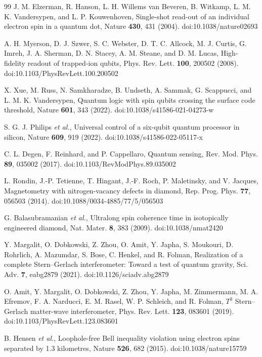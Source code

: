 \documentclass[12pt]{article}
\begin{document}
\begin{thebibliography}{99}
 J. M. Elzerman, R. Hanson, L. H. Willems van Beveren, B. Witkamp, L. M. K. Vandersypen, and L. P. Kouwenhoven, Single-shot read-out of an individual electron spin in a quantum dot, Nature \textbf{430}, 431 (2004). doi:10.1038/nature02693

 A. H. Myerson, D. J. Szwer, S. C. Webster, D. T. C. Allcock, M. J. Curtis, G. Imreh, J. A. Sherman, D. N. Stacey, A. M. Steane, and D. M. Lucas, High-fidelity readout of trapped-ion qubits, Phys. Rev. Lett. \textbf{100}, 200502 (2008). doi:10.1103/PhysRevLett.100.200502

 X. Xue, M. Russ, N. Samkharadze, B. Undseth, A. Sammak, G. Scappucci, and L. M. K. Vandersypen, Quantum logic with spin qubits crossing the surface code threshold, Nature \textbf{601}, 343 (2022). doi:10.1038/s41586-021-04273-w

 S. G. J. Philips \emph{et al.}, Universal control of a six-qubit quantum processor in silicon, Nature \textbf{609}, 919 (2022). doi:10.1038/s41586-022-05117-x

 C. L. Degen, F. Reinhard, and P. Cappellaro, Quantum sensing, Rev. Mod. Phys. \textbf{89}, 035002 (2017). doi:10.1103/RevModPhys.89.035002

 L. Rondin, J.-P. Tetienne, T. Hingant, J.-F. Roch, P. Maletinsky, and V. Jacques, Magnetometry with nitrogen-vacancy defects in diamond, Rep. Prog. Phys. \textbf{77}, 056503 (2014). doi:10.1088/0034-4885/77/5/056503

 G. Balasubramanian \emph{et al.}, Ultralong spin coherence time in isotopically engineered diamond, Nat. Mater. \textbf{8}, 383 (2009). doi:10.1038/nmat2420

 Y. Margalit, O. Dobkowski, Z. Zhou, O. Amit, Y. Japha, S. Moukouri, D. Rohrlich, A. Mazumdar, S. Bose, C. Henkel, and R. Folman, Realization of a complete Stern--Gerlach interferometer: Toward a test of quantum gravity, Sci. Adv. \textbf{7}, eabg2879 (2021). doi:10.1126/sciadv.abg2879

 O. Amit, Y. Margalit, O. Dobkowski, Z. Zhou, Y. Japha, M. Zimmermann, M. A. Efremov, F. A. Narducci, E. M. Rasel, W. P. Schleich, and R. Folman, $T^3$ Stern--Gerlach matter-wave interferometer, Phys. Rev. Lett. \textbf{123}, 083601 (2019). doi:10.1103/PhysRevLett.123.083601

 B. Hensen \emph{et al.}, Loophole-free Bell inequality violation using electron spins separated by 1.3 kilometres, Nature \textbf{526}, 682 (2015). doi:10.1038/nature15759


\end{thebibliography}
\end{document}
